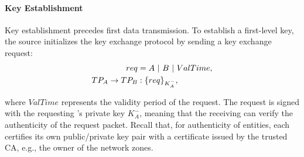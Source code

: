 

\paragraph{Key Establishment}
Key establishment precedes first data transmission. To establish a first-level key,
the source \tp initializes the key exchange protocol by sending a key exchange request:
\noindent
\begin{subequations}
	\begin{align}
		req                     & = A~|~B~|~ValTime, \\
		TP_A \rightarrow TP_B & : \{req\}_{K^-_A}, 
	\end{align}
	\label{eq:req}
\end{subequations}

\noindent 
where $ValTime$ represents the validity period of the request. The request is signed with
the requesting \tp's private key ${K^-_A}$, meaning that the receiving \tp can verify the
authenticity of the request packet. Recall that, for authenticity of \name entities, each
\tp certifies its own public/private key pair with a certificate issued by the trusted CA,
e.g., the owner of the network zones.


